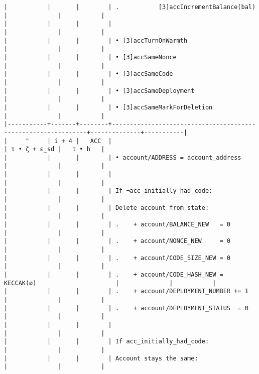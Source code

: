 \documentclass[varwidth=\maxdimen,margin=0.5cm,multi={verbatim}]{standalone}
\begin{document}
\begin{verbatim}
|           |       |        | .           [3]accIncrementBalance(bal)                       |              |           |
|           |       |        |                                                               |              |           |
|           |       |        | • [3]accTurnOnWarmth                                          |              |           |
|           |       |        | • [3]accSameNonce                                             |              |           |
|           |       |        | • [3]accSameCode                                              |              |           |
|           |       |        | • [3]accSameDeployment                                        |              |           |
|           |       |        | • [3]accSameMarkForDeletion                                   |              |           |
|-----------+-------+--------+---------------------------------------------------------------+--------------+-----------|
|     "     | i + 4 |   ACC  |                                                               | τ • ζ + ε_sd |   τ • h   |
|           |       |        | • account/ADDRESS = account_address                           |              |           |
|           |       |        |                                                               |              |           |
|           |       |        | If ¬acc_initially_had_code:                                   |              |           |
|           |       |        | Delete account from state:                                    |              |           |
|           |       |        | .    + account/BALANCE_NEW   = 0                              |              |           |
|           |       |        | .    + account/NONCE_NEW     = 0                              |              |           |
|           |       |        | .    + account/CODE_SIZE_NEW = 0                              |              |           |
|           |       |        | .    + account/CODE_HASH_NEW = KECCAK(∅)                      |              |           |
|           |       |        | .    + account/DEPLOYMENT_NUMBER += 1                         |              |           |
|           |       |        | .    + account/DEPLOYMENT_STATUS  = 0                         |              |           |
|           |       |        |                                                               |              |           |
|           |       |        | If acc_initially_had_code:                                    |              |           |
|           |       |        | Account stays the same:                                       |              |           |

\end{verbatim}
\end{document}
